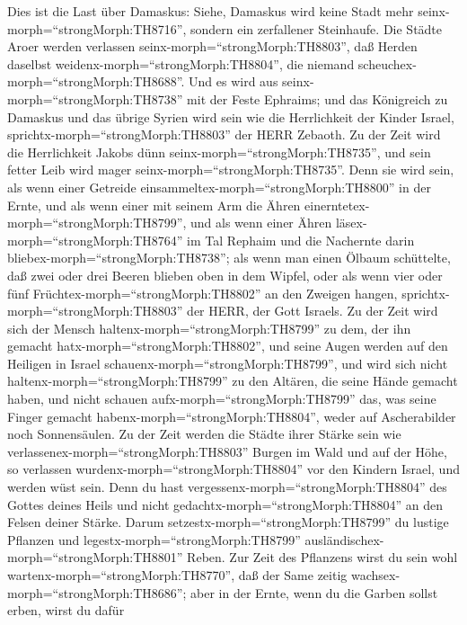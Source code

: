  Dies ist die Last über Damaskus: Siehe, Damaskus wird keine
Stadt mehr seinx-morph=``strongMorph:TH8716'', sondern ein zerfallener
Steinhaufe.  Die Städte Aroer werden verlassen
seinx-morph=``strongMorph:TH8803'', daß Herden daselbst
weidenx-morph=``strongMorph:TH8804'', die niemand
scheuchex-morph=``strongMorph:TH8688''.  Und es wird aus
seinx-morph=``strongMorph:TH8738'' mit der Feste Ephraims; und das
Königreich zu Damaskus und das übrige Syrien wird sein wie die
Herrlichkeit der Kinder Israel, sprichtx-morph=``strongMorph:TH8803''
der HERR Zebaoth.  Zu der Zeit wird die Herrlichkeit Jakobs
dünn seinx-morph=``strongMorph:TH8735'', und sein fetter Leib wird mager
seinx-morph=``strongMorph:TH8735''.  Denn sie wird sein, als
wenn einer Getreide einsammeltex-morph=``strongMorph:TH8800'' in der
Ernte, und als wenn einer mit seinem Arm die Ähren
einerntetex-morph=``strongMorph:TH8799'', und als wenn einer Ähren
läsex-morph=``strongMorph:TH8764'' im Tal Rephaim  und die
Nachernte darin bliebex-morph=``strongMorph:TH8738''; als wenn man einen
Ölbaum schüttelte, daß zwei oder drei Beeren blieben oben in dem Wipfel,
oder als wenn vier oder fünf Früchtex-morph=``strongMorph:TH8802'' an
den Zweigen hangen, sprichtx-morph=``strongMorph:TH8803'' der HERR, der
Gott Israels.  Zu der Zeit wird sich der Mensch
haltenx-morph=``strongMorph:TH8799'' zu dem, der ihn gemacht
hatx-morph=``strongMorph:TH8802'', und seine Augen werden auf den
Heiligen in Israel schauenx-morph=``strongMorph:TH8799'', 
und wird sich nicht haltenx-morph=``strongMorph:TH8799'' zu den Altären,
die seine Hände gemacht haben, und nicht schauen
aufx-morph=``strongMorph:TH8799'' das, was seine Finger gemacht
habenx-morph=``strongMorph:TH8804'', weder auf Ascherabilder noch
Sonnensäulen.  Zu der Zeit werden die Städte ihrer Stärke
sein wie verlassenex-morph=``strongMorph:TH8803'' Burgen im Wald und auf
der Höhe, so verlassen wurdenx-morph=``strongMorph:TH8804'' vor den
Kindern Israel, und werden wüst sein.  Denn du hast
vergessenx-morph=``strongMorph:TH8804'' des Gottes deines Heils und
nicht gedachtx-morph=``strongMorph:TH8804'' an den Felsen deiner Stärke.
Darum setzestx-morph=``strongMorph:TH8799'' du lustige Pflanzen und
legestx-morph=``strongMorph:TH8799''
ausländischex-morph=``strongMorph:TH8801'' Reben.  Zur Zeit
des Pflanzens wirst du sein wohl wartenx-morph=``strongMorph:TH8770'',
daß der Same zeitig wachsex-morph=``strongMorph:TH8686''; aber in der
Ernte, wenn du die Garben sollst erben, wirst du dafür
